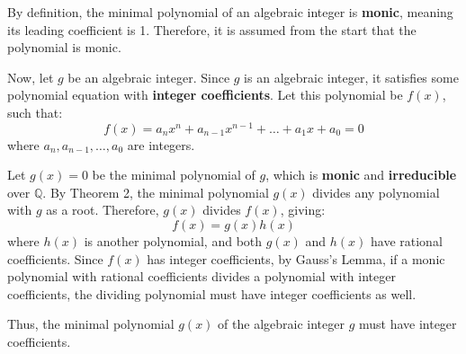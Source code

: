 \documentclass{article}
\newenvironment{proofbox}
  {\begin{mdframed}[linewidth=1pt,linecolor=black,backgroundcolor=white]\noindent\ignorespaces}
  {\end{mdframed}}
\begin{document}
\begin{proofbox}
    By definition, the minimal polynomial of an algebraic integer is \textbf{monic}, meaning its leading coefficient is 1. Therefore, it is assumed from the start that the polynomial is monic.

    Now, let \( g \) be an algebraic integer. Since \( g \) is an algebraic integer, it satisfies some polynomial equation with \textbf{integer coefficients}. Let this polynomial be \( f(x) \), such that:
    \[
    f(x) = a_n x^n + a_{n-1} x^{n-1} + \dots + a_1 x + a_0 = 0
    \]
    where \( a_n, a_{n-1}, \dots, a_0 \) are integers.
    
    Let \( g(x) = 0 \) be the minimal polynomial of \( g \), which is \textbf{monic} and \textbf{irreducible} over \( \mathbb{Q} \). By Theorem 2, the minimal polynomial \( g(x) \) divides any polynomial with \( g \) as a root. Therefore, \( g(x) \) divides \( f(x) \), giving:
    \[
    f(x) = g(x) h(x)
    \]
    where \( h(x) \) is another polynomial, and both \( g(x) \) and \( h(x) \) have rational coefficients. Since \( f(x) \) has integer coefficients, by Gauss's Lemma, if a monic polynomial with rational coefficients divides a polynomial with integer coefficients, the dividing polynomial must have integer coefficients as well.
    
    Thus, the minimal polynomial \( g(x) \) of the algebraic integer \( g \) must have integer coefficients.
    
\end{proofbox}


\end{document}
